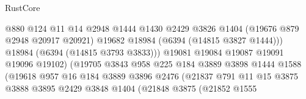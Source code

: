 \begin{lexlean}{RustCore}
\begin{coremodule}
                                            @880
                                            @124
                                            @11
                                            @14
                                            @2948
                                            @1444
                                            @1430
                                            @2429
                                            @3826
                                            @1404
                                            (@19676 @879 @2948 @20917 @20921)
                                            @19682
                                            @18984
                                            (@6394 (@14815 @3827 @1444)))
                                          @18984
                                          (@6394 (@14815 @3793 @3833)))
                                        @19081
                                        @19084
                                        @19087
                                        @19091
                                        @19096
                                        @19102)
                                      (@19705
                                        @3843
                                        @958
                                        @225
                                        @184
                                        @3889
                                        @3898
                                        @1444
                                        @1588
                                        (@19618
                                          @957
                                          @16
                                          @184
                                          @3889
                                          @3896
                                          @2476
                                          (@21837
                                            @791
                                            @11
                                            @15
                                            @3875
                                            @3888
                                            @3895
                                            @2429
                                            @3848
                                            @1404
                                            (@21848
                                              @3875
                                              (@21852
                                                @1555

\end{coremodule}
\end{lexlean}
